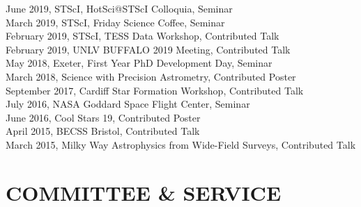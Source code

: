 \documentclass[letter, margin, 10pt]{res} %
\begin{document}
\begin{resume}
June 2019, STScI, HotSci@STScI Colloquia, Seminar\\
March 2019, STScI, Friday Science Coffee, Seminar\\
February 2019, STScI, TESS Data Workshop, Contributed Talk\\
February 2019, UNLV BUFFALO 2019 Meeting, Contributed Talk\\
May 2018, Exeter, First Year PhD Development Day, Seminar\\
March 2018, Science with Precision Astrometry, Contributed Poster\\
September 2017, Cardiff Star Formation Workshop, Contributed Talk\\
July 2016, NASA Goddard Space Flight Center, Seminar\\
June 2016, Cool Stars 19, Contributed Poster\\
April 2015, BECSS Bristol, Contributed Talk\\
March 2015, Milky Way Astrophysics from Wide-Field Surveys, Contributed Talk

 \vspace{-6pt}
\section{COMMITTEE \& SERVICE}


\end{resume}
\end{document}
